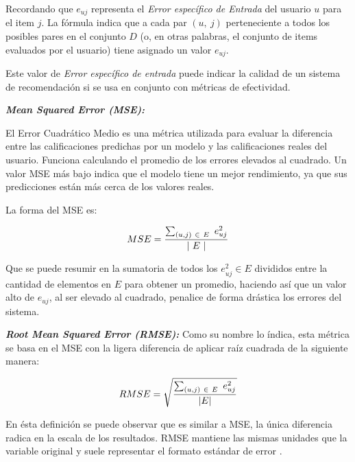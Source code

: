\begin{itemize}
\begin{itemize}[label=$\diamond$]
            Recordando que $e_{uj}$ representa el \textit{Error específico de Entrada} del usuario $u$ para el item $j$. La fórmula indica que a cada par $( u, \ j )$ perteneciente a todos los posibles pares en el conjunto $D$ (o, en otras palabras, el conjunto de items evaluados por el usuario) tiene asignado un valor $e_{uj}$. 

            Este valor de \textit{Error específico de entrada} puede indicar la calidad de un sistema de recomendación si se usa en conjunto con métricas de efectividad.

            \newpage

            \textit{\textbf{Mean Squared Error (MSE): }} 
            
            El Error Cuadrático Medio es una métrica utilizada para evaluar la diferencia entre las calificaciones predichas por un modelo y las calificaciones reales del usuario. Funciona calculando el promedio de los errores elevados al cuadrado. Un valor MSE más bajo indica que el modelo tiene un mejor rendimiento, ya que sus predicciones están más cerca de los valores reales.
            
            La forma del MSE es: 

            \begin{equation}
                MSE = \frac{\sum_{(u, j) \ \in \ E \ }{e^2_{uj}}}{| \ E \ |}
                \addequation{Definición de Mean Squared Error}
            \end{equation}

            Que se puede resumir en la sumatoria de todos los $e_{uj}^2 \in E$ divididos entre la cantidad de elementos en $E$ para obtener un promedio, haciendo así que un valor alto de $e_{uj}$, al ser elevado al cuadrado, penalice de forma drástica los errores del sistema.

            \textbf{\textit{Root Mean Squared Error (RMSE): }} Como su nombre lo índica, esta métrica se basa en el MSE con la ligera diferencia de aplicar raíz cuadrada de la siguiente manera: 

            \begin{equation}
                RMSE = \sqrt{\frac{\sum_{(u,j) \ \in \ E}{\ e^2_{uj}}}{ \ |E| \ }}
                \addequation{Definición de Root Mean Squared Error}
            \end{equation}
            
            En ésta definición se puede observar que es similar a MSE, la única diferencia radica en la escala de los resultados. RMSE mantiene las mismas unidades que la variable original y suele representar el formato estándar de error \parencite{gmd-15-5481-2022}.


\end{itemize}
\end{itemize}
